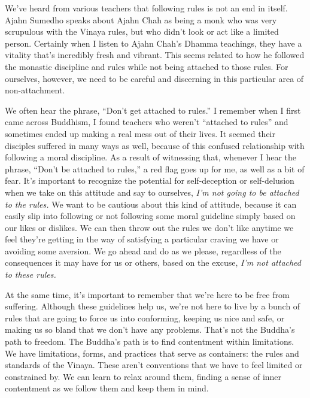 We've heard from various teachers that following rules is not an end in 
itself. Ajahn Sumedho speaks about Ajahn Chah as being a monk who was 
very scrupulous with the Vinaya rules, but who didn't look or act like 
a limited person. Certainly when I listen to Ajahn Chah's Dhamma 
teachings, they have a vitality that's incredibly fresh and vibrant. 
This seems related to how he followed the monastic discipline and rules 
while not being attached to those rules. For ourselves, however, we 
need to be careful and discerning in this particular area of 
non-attachment.

We often hear the phrase, ``Don't get attached to rules.'' I remember
when I first came across Buddhism, I found teachers who weren't
``attached to rules'' and sometimes ended up making a real mess out of
their lives. It seemed their disciples suffered in many ways as well,
because of this confused relationship with following a moral discipline.
As a result of \mbox{witnessing} that, whenever I hear the phrase,
``Don't be attached to rules,'' a red flag goes up for me, as well as a
bit of fear. It's important to recognize the potential for
self-deception or self-delusion when we take on this attitude and say to
ourselves, \emph{I'm not going to be attached to the rules.} We want to
be cautious about this kind of attitude, because it can easily slip into
following or not following some moral guideline simply based on our
likes or dislikes. We can then throw out the rules we don't like anytime
we feel they're getting in the way of satisfying a particular craving we
have or avoiding some aversion. We go ahead and do as we please,
regardless of the consequences it may have for us or others, based on
the excuse, \emph{I'm not attached to these rules.}

At the same time, it's important to remember that we're here to be free 
from suffering. Although these guidelines help us, we're not here to 
live by a bunch of rules that are going to force us into conforming, 
keeping us nice and safe, or making us so bland that we don't have any 
problems. That's not the Buddha's path to freedom. The Buddha's path is 
to find contentment within limitations. We have limitations, forms, and 
practices that serve as containers: the rules and standards of the 
Vinaya. These aren't conventions that we have to feel limited or 
constrained by. We can learn to relax around them, finding a sense of 
inner contentment as we follow them and keep them in mind.

